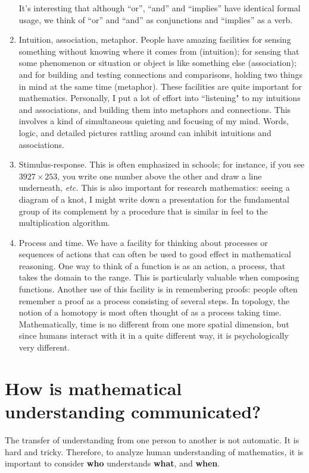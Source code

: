 \documentclass[12pt]{amsart}
\begin{document}
\begin{enumerate}
It's interesting that although ``or'', ``and''
and ``implies'' have identical formal usage, we think of 
``or'' and ``and''
as conjunctions and ``implies'' as a verb.
\item  Intuition, association, metaphor.  People have 
amazing 
facilities for sensing something without knowing where it 
comes 
from (intuition); for sensing that some phenomenon or 
situation or 
object is like something else (association); and for 
building and testing connections 
and comparisons, holding two things in mind at the same 
time (metaphor).
These facilities are quite important for mathematics.  
Personally, I put a lot of effort into ``listening" to my 
intuitions and 
associations, and building them into metaphors and 
connections. This involves
a kind of simultaneous quieting and focusing of
my mind.  Words, logic, and detailed pictures rattling 
around can inhibit
intuitions and associations.
\item Stimulus-response.  This is often emphasized in 
schools; for instance, if you see $3927 \times 253$,  you 
write one number above the other and draw a line 
underneath, {\it etc.}
This is also important for research mathematics: seeing a 
diagram of a 
knot, I might write down a presentation for the 
fundamental group of its 
complement by a procedure that is similar in feel to the 
multiplication
algorithm.
\item  Process and time.  We have a facility for thinking 
about
processes or sequences of actions that can often be used 
to good effect 
in mathematical reasoning. One way to think of a function 
is as an 
action, a process, that takes the domain to the range.  
This is particularly
valuable when composing functions.  Another use of this 
facility is in remembering proofs:  people often remember 
a proof as a process
consisting of several steps. In topology, the notion of a 
homotopy is 
most often thought of as a process taking time.   
Mathematically, time is 
no different from one more spatial dimension, but since 
humans interact 
with it in a quite different way, it is psychologically 
very different.
\end{enumerate}

\section{How is mathematical understanding communicated?}

The transfer of understanding from one person
to another is not automatic. It is hard and tricky.
Therefore, to analyze human understanding of mathematics, 
it is
important to consider {\bf who} understands {\bf what}, 
and {\bf when}.
\end{document}
